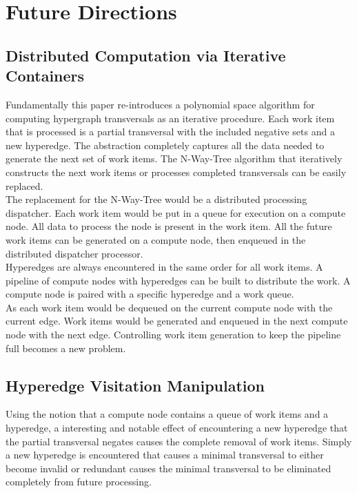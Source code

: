 \chapter{Future Directions}

\section{Distributed Computation via Iterative Containers}
Fundamentally this paper re-introduces a polynomial space algorithm for computing hypergraph transversals as an iterative procedure. Each work item that is processed is a partial transversal with the included negative sets and a new hyperedge. The abstraction completely captures all the data needed to generate the next set of work items. The N-Way-Tree algorithm that iteratively constructs the next work items or processes completed transversals can be easily replaced.\\

The replacement for the N-Way-Tree would be a distributed processing dispatcher. Each work item would be put in a queue for execution on a compute node. All data to process the node is present in the work item. All the future work items can be generated on a compute node, then enqueued in the distributed dispatcher processor. \\

Hyperedges are always encountered in the same order for all work items. A pipeline of compute nodes with hyperedges can be built to distribute the work. A compute node is paired with a specific hyperedge and a work queue.\\

As each work item would be dequeued on the current compute node with the current edge. Work items would be generated and enqueued in the next compute node with the next edge. Controlling work item generation to keep the pipeline full becomes a new problem.\\


\section{Hyperedge Visitation Manipulation}
Using the notion that a compute node contains a queue of work items and a hyperedge, a interesting and notable effect of encountering a new hyperedge that the partial transversal negates causes the complete removal of work items. Simply a new hyperedge is encountered that causes a minimal transversal to either become invalid or redundant causes the minimal transversal to be eliminated completely from future processing. \\

